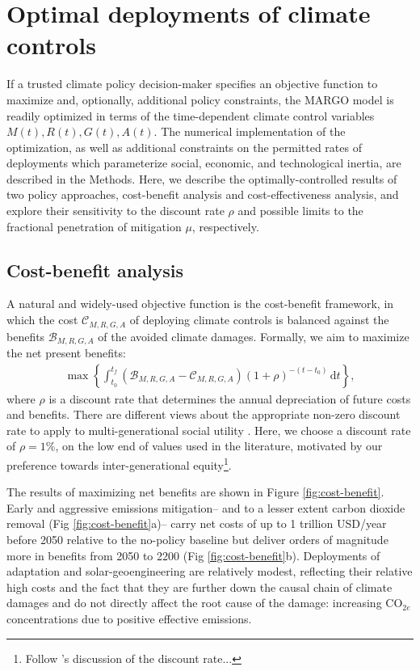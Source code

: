 \documentclass[9pt,twocolumn,twoside,lineno]{pnas-new}
\begin{document}
\section*{Optimal deployments of climate controls}\label{sec:optimal-deployment}

If a trusted climate policy decision-maker specifies an objective function to maximize and, optionally, additional policy constraints, the MARGO model is readily optimized in terms of the time-dependent climate control variables $M(t), R(t), G(t), A(t)$. The numerical implementation of the optimization, as well as additional constraints on the permitted rates of deployments which parameterize social, economic, and technological inertia, are described in the Methods. Here, we describe the optimally-controlled results of two policy approaches, cost-benefit analysis and cost-effectiveness analysis, and explore their sensitivity to the discount rate $\rho$ and possible limits to the fractional penetration of mitigation $\mu$, respectively.

\subsection*{Cost-benefit analysis}\label{sec:cost-benefit}

A natural and widely-used objective function is the cost-benefit framework, in which the cost $\mathcal{C}_{M, R, G, A}$ of deploying climate controls is balanced against the benefits $\mathcal{B}_{M, R, G, A}$ of the avoided climate damages. Formally, we aim to maximize the net present benefits:
\begin{gather}
    \max \left\{ \int_{t_{0}}^{t_{f}} 
    \left(\mathcal{B}_{M, R, G, A} - \mathcal{C}_{M, R, G, A} \right) (1 + \rho)^{-(t-t_{0})} \, \text{d}t \right\},
    \label{eq:net-present-benefits}
\end{gather}
where $\rho$ is a discount rate that determines the annual depreciation of future costs and benefits. There are different views about the appropriate non-zero discount rate to apply to multi-generational social utility \cite{ramsey_mathematical_1928, solow_economics_1974, stern_economics_2007}. Here, we choose a discount rate of $\rho = 1\%$, on the low end of values used in the literature, motivated by our preference towards inter-generational equity\footnote{Follow \cite{stern_economics_2007}'s discussion of the discount rate...}.

The results of maximizing net benefits are shown in Figure \ref{fig:cost-benefit}. Early and aggressive emissions mitigation– and to a lesser extent carbon dioxide removal (Fig \ref{fig:cost-benefit}a)– carry net costs of up to 1 trillion USD/year before 2050 relative to the no-policy baseline but deliver orders of magnitude more in benefits from 2050 to 2200 (Fig \ref{fig:cost-benefit}b). Deployments of adaptation and solar-geoengineering are relatively modest, reflecting their relative high costs and the fact that they are further down the causal chain of climate damages and do not directly affect the root cause of the damage: increasing CO$_{2e}$ concentrations due to positive effective emissions.
\end{document}
